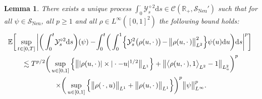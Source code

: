 \documentclass[10pt]{amsart}
\newtheorem{lemm}[theo]{Lemma}\newtheorem{prop}[theo]{Proposition}\newtheorem{coro}[theo]{Corollary}\newtheorem{conj}[theo]{Conjecture}
\theoremstyle{definition}\newtheorem{defi}[theo]{Definition}\newtheorem{rema}[theo]{Remark}\newtheorem{exam}[theo]{Example}\newtheorem{exem}[theo]{Example}\newtheorem{nota}[theo]{Notation}
\DeclareMathOperator{\Neu}{Neu}
\newcommand{\mc}[1]{{\mathcal #1}}
\renewcommand{\mc}[1]{{\mathcal #1}}
\newcommand{\SN}{\ensuremath{\mc S_{\Neu}}}
\renewcommand{\geq}{\geqslant}
\newcommand*{\dd}{\mathrm{d}}
\newcommand*{\ds}{\dd s}
\newcommand*{\du}{\dd u}
\newcommand*{\mk}{\mkern -1mu}
\newcommand*{\Mk}{\mkern -2mu}
\begin{document}
\begin{lemm}\label{lem:kpz nonlin}
There exists a unique process $\int_0^{\cdot}
\mc Y_s^{\diamond 2} \ds \in \mc C (\mathbb{R}_+, \SN')$ such that for all $\psi \in \SN$, all $p \geq 1$ and all $\rho \in L^{\infty} ([0, 1]^2)$ the following bound holds:
\begin{multline}\label{eq:kpz-nonlin}
\!\!\mathbb{E} \bigg[\sup_{t \in [0, T]} \bigg| \bigg(\int_0^t \!\mc Y_s^{\diamond 2} \ds\bigg) (\psi) - \!\int_0^t \!\bigg(\int_0^1\! \Big\{ \mc Y^2_s \big(\rho (u,\cdot\,)\big) \Mk-\mk \big\| \rho (u, \cdot\,) \big\|_{L^2}^2 \Big\} \psi (u) \du \bigg) \ds \bigg|^p \bigg]\\
\lesssim T^{p / 2} \bigg(\sup_{u\in[0,1]} \Big\{\big\| | \rho (u, \cdot\,) | \times | \cdot - u |^{1/2} \big\|_{L^1}\Big\} + \big\| \big\langle \rho (u, \cdot\,), 1 \big\rangle_{L^2} - 1 \big\|_{L^2_u}\bigg)^p \vphantom{\int_0^t}\\
\times \bigg(\sup_{u\in[0,1]} \Big\{ \big\| \rho (\,\cdot\,, u) \big\|_{L^1} + \big\| \rho (u, \cdot\,)\big\|_{L^1} \Big\}\bigg)^p \big\| \psi \big\|_{L^{\infty}}^p.
\end{multline}
\end{lemm}
\end{document}
